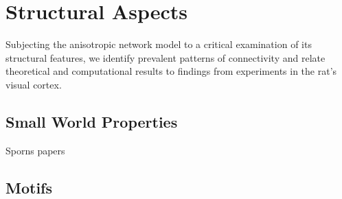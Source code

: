\chapter{Structural Aspects}\label{ch:structural_aspects} %
Subjecting the anisotropic network model to a critical
examination of its structural features, we identify prevalent
patterns of connectivity and relate theoretical and computational
results to findings from experiments in the rat's visual cortex.











\section{Small World Properties}

Sporns papers



\section{Motifs}




